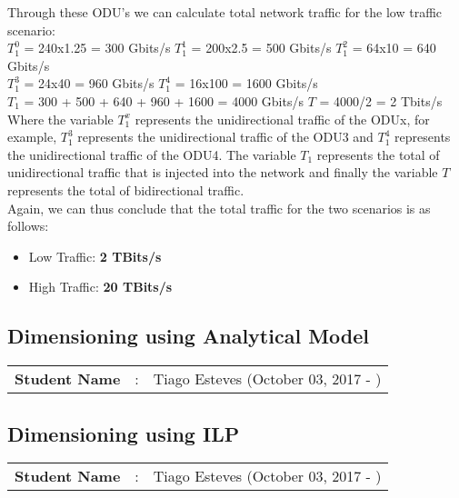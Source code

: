 Through these ODU's we can calculate total network traffic for the low traffic scenario:\\

$T_1^0$ = 240x1.25 = 300 Gbits/s \qquad
$T_1^1$ = 200x2.5 = 500 Gbits/s \qquad
$T_1^2$ = 64x10 = 640 Gbits/s \\

$T_1^3$ = 24x40 = 960 Gbits/s \quad
$T_1^4$ = 16x100 = 1600 Gbits/s \\

$T_{1}$ = 300 + 500 + 640 + 960 + 1600 = 4000 Gbits/s \qquad
$T$ = 4000/2 = 2 Tbits/s\\

Where the variable $T_1^x$ represents the unidirectional traffic of the ODUx, for example, $T_1^3$ represents the unidirectional traffic of the ODU3 and $T_1^4$ represents the unidirectional traffic of the ODU4. The variable $T_{1}$ represents the total of unidirectional traffic that is injected into the network and finally the variable $T$ represents the total of bidirectional traffic.\\

Again, we can thus conclude that the total traffic for the two scenarios is as follows:
\begin{itemize}
  \item Low Traffic: \textbf{2 TBits/s}
  \item High Traffic: \textbf{20 TBits/s}
\end{itemize}


\subsection{Dimensioning using Analytical Model}
\begin{tcolorbox}	
\begin{tabular}{p{2.75cm} p{0.2cm} p{10.5cm}} 	
\textbf{Student Name}  &:& Tiago Esteves    (October 03, 2017 - )\\
\end{tabular}
\end{tcolorbox}


\subsection{Dimensioning using ILP}
\begin{tcolorbox}	
\begin{tabular}{p{2.75cm} p{0.2cm} p{10.5cm}} 	
\textbf{Student Name}  &:& Tiago Esteves    (October 03, 2017 - )\\
\end{tabular}
\end{tcolorbox}

